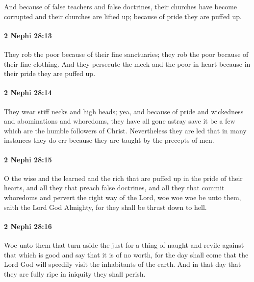 			And because of false teachers and false doctrines,
			their churches have become corrupted and their churches are lifted up;
			because of pride they are puffed up.

		\paragraph{2 Nephi 28:13} %
			\label{2NEPHI-28-13}

			They rob the poor because of their fine sanctuaries;
			they rob the poor because of their fine clothing.
			And they persecute the meek and the poor in heart
			because in their pride they are puffed up.

		\paragraph{2 Nephi 28:14} %
			\label{2NEPHI-28-14}

			They wear stiff necks and high heads;
			yea, and because of pride and wickedness and abominations and whoredoms,
			they have all gone astray
			save it be a few which are the humble followers of Christ.
			Nevertheless they are led that in many instances they do err
			because they are taught by the precepts of men.

		\paragraph{2 Nephi 28:15} %
			\label{2NEPHI-28-15}

			O the wise and the learned and the rich
			that are puffed up in the pride of their hearts,
			and all they that preach false doctrines,
			and all they that commit whoredoms and pervert the right way of the Lord,
			woe woe woe be unto them, saith the Lord God Almighty,
			for they shall be thrust down to hell.

		\paragraph{2 Nephi 28:16} %
			\label{2NEPHI-28-16}

			Woe unto them that turn aside the just for a thing of naught
			and revile against that which is good
			and say that it is of no worth,
			for the day shall come
			that the Lord God will speedily visit the inhabitants of the earth.
			And in that day that they are fully ripe in iniquity they shall perish.

